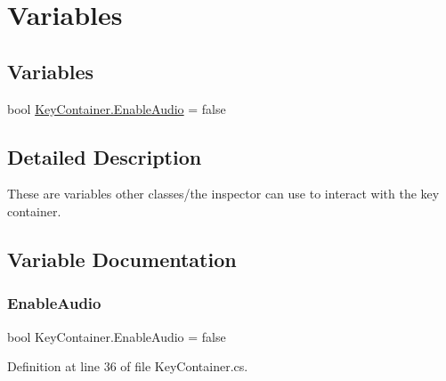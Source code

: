 \hypertarget{group___key_contain_pub_var}{}\section{Variables}
\label{group___key_contain_pub_var}
\subsection*{Variables}
\begin{DoxyCompactItemize}
\item 
bool \hyperlink{group___key_contain_pub_var_ga5dc9b1349f8fafc894c7f739f6780a8c}{Key\+Container.\+Enable\+Audio} = false
\end{DoxyCompactItemize}


\subsection{Detailed Description}
These are variables other classes/the inspector can use to interact with the key container. 

\subsection{Variable Documentation}
\mbox{\label{group___key_contain_pub_var_ga5dc9b1349f8fafc894c7f739f6780a8c}} 
\subsubsection{\texorpdfstring{Enable\+Audio}{EnableAudio}}
{\footnotesize\ttfamily bool Key\+Container.\+Enable\+Audio = false}



Definition at line 36 of file Key\+Container.\+cs.

